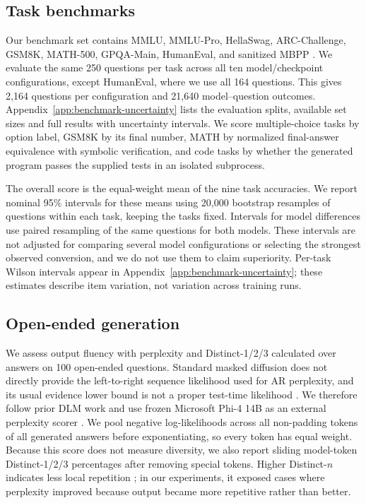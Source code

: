 \documentclass{article}
\begin{document}
\subsection{Task benchmarks}
Our benchmark set contains MMLU, MMLU-Pro, HellaSwag, ARC-Challenge, GSM8K, MATH-500, GPQA-Main, HumanEval, and sanitized MBPP \citep{hendrycks2021mmlu,wang2024mmlupro,zellers2019hellaswag,clark2018arc,cobbe2021gsm8k,hendrycks2021math,rein2023gpqa,chen2021codex,austin2021mbpp}. We evaluate the same 250 questions per task across all ten model/checkpoint configurations, except HumanEval, where we use all 164 questions. This gives 2,164 questions per configuration and 21,640 model--question outcomes. Appendix~\ref{app:benchmark-uncertainty} lists the evaluation splits, available set sizes and full results with uncertainty intervals. We score multiple-choice tasks by option label, GSM8K by its final number, MATH by normalized final-answer equivalence with symbolic verification, and code tasks by whether the generated program passes the supplied tests in an isolated subprocess.

The overall score is the equal-weight mean of the nine task accuracies. We report nominal 95\% intervals for these means using 20,000 bootstrap resamples of questions within each task, keeping the tasks fixed. Intervals for model differences use paired resampling of the same questions for both models. These intervals are not adjusted for comparing several model configurations or selecting the strongest observed conversion, and we do not use them to claim superiority. Per-task Wilson intervals appear in Appendix~\ref{app:benchmark-uncertainty}; these estimates describe item variation, not variation across training runs.

\subsection{Open-ended generation}
We assess output fluency with perplexity and Distinct-1/2/3 calculated over answers on 100 open-ended questions. Standard masked diffusion does not directly provide the left-to-right sequence likelihood used for AR perplexity, and its usual evidence lower bound is not a proper test-time likelihood \citep{turok2026duel}. We therefore follow prior DLM work and use frozen Microsoft Phi-4 14B as an external perplexity scorer \citep{gong2025diffullama}. We pool negative log-likelihoods across all non-padding tokens of all generated answers before exponentiating, so every token has equal weight. Because this score does not measure diversity, we also report sliding model-token Distinct-1/2/3 percentages after removing special tokens. Higher Distinct-$n$ indicates less local repetition \citep{li2016diversity}; in our experiments, it exposed cases where perplexity improved because output became more repetitive rather than better.
\end{document}
